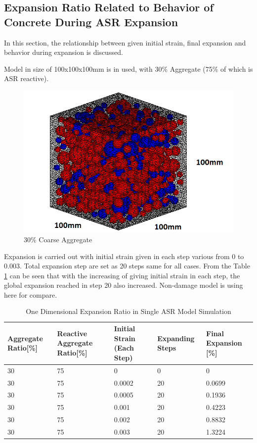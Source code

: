 \clearpage
\subsection{Expansion Ratio Related to Behavior of Concrete During ASR Expansion}

In this section, the relationship between given initial strain, final expansion and behavior during expansion is discussed.

Model in size of 100x100x100mm is in used, with 30\% Aggregate (75\% of which is ASR reactive).

\begin{figure}[ht]
\centering
\includegraphics[width=.3\linewidth]{Files/Aggregate/A30P75.png}
  \caption{30\% Coarse Aggregate}
\end{figure}

Expansion is carried out with initial strain given in each step various from 0 to 0.003. Total expansion step are set as 20 steps same for all cases. From the Table \ref{table:ASR_30_EXP} can be seen that with the increasing of giving initial strain in each step, the global expansion reached in step 20 also increased. Non-damage model is using here for compare.

\begin{table}[ht!]
\centering
\begin{tabular}{ ||p{2cm}|p{2cm}|p{2cm}|p{2cm}|p{2cm}|| }
 \hline
 Aggregate Ratio[\%] &  Reactive Aggregate Ratio[\%]  & Initial Strain (Each Step) & Expanding Steps & Final Expansion [\%] \\ [0.5ex]
 \hline\hline
 30 & 75 & 0 & 0 & 0\\
 30 & 75 & 0.0002 & 20 & 0.0699\\
 30 & 75 & 0.0005 & 20 & 0.1936\\
 30 & 75 & 0.001 & 20 & 0.4223\\
 30 & 75 & 0.002 & 20 & 0.8832\\
 30 & 75 & 0.003 & 20 & 1.3224\\
 \hline
\end{tabular}
\caption{One Dimensional Expansion Ratio in Single ASR Model Simulation}
\label{table:ASR_30_EXP}
\end{table}

